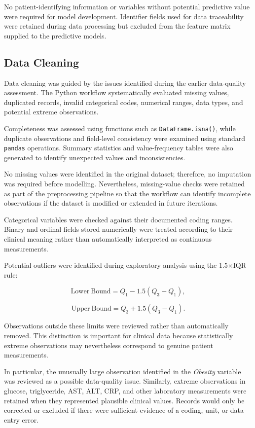 No patient-identifying information or variables without potential predictive
value were required for model development. Identifier fields used for data
traceability were retained during data processing but excluded from the feature
matrix supplied to the predictive models.


\subsection{Data Cleaning}
\label{subsec:data-cleaning}

Data cleaning was guided by the issues identified during the earlier
data-quality assessment. The Python workflow systematically evaluated missing
values, duplicated records, invalid categorical codes, numerical ranges, data
types, and potential extreme observations.

Completeness was assessed using functions such as
\texttt{DataFrame.isna()}, while duplicate observations and field-level
consistency were examined using standard \texttt{pandas} operations. Summary
statistics and value-frequency tables were also generated to identify
unexpected values and inconsistencies.

No missing values were identified in the original dataset; therefore, no
imputation was required before modelling. Nevertheless, missing-value checks
were retained as part of the preprocessing pipeline so that the workflow can
identify incomplete observations if the dataset is modified or extended in
future iterations.

Categorical variables were checked against their documented coding ranges.
Binary and ordinal fields stored numerically were treated according to their
clinical meaning rather than automatically interpreted as continuous
measurements.

Potential outliers were identified during exploratory analysis using the
1.5$\times$IQR rule:

\[
    \mathrm{Lower\ Bound} =
    Q_1 - 1.5(Q_3-Q_1),
\]

\[
    \mathrm{Upper\ Bound} =
    Q_3 + 1.5(Q_3-Q_1).
\]

Observations outside these limits were reviewed rather than automatically
removed. This distinction is important for clinical data because statistically
extreme observations may nevertheless correspond to genuine patient
measurements.

In particular, the unusually large observation identified in the
\textit{Obesity} variable was reviewed as a possible data-quality issue.
Similarly, extreme observations in glucose, triglyceride, AST, ALT, CRP, and
other laboratory measurements were retained when they represented plausible
clinical values. Records would only be corrected or excluded if there were
sufficient evidence of a coding, unit, or data-entry error.

